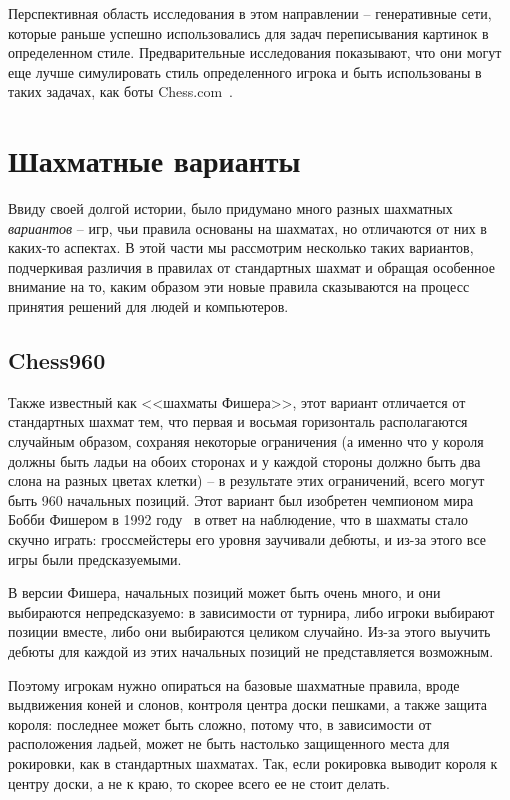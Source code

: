 \documentclass{article}
\begin{document}
Перспективная область исследования в этом направлении -- генеративные сети,
которые раньше успешно использовались для задач переписывания картинок в определенном стиле.
Предварительные исследования показывают, что они могут еще лучше симулировать стиль определенного игрока
и быть использованы в таких задачах, как боты Chess.com~\cite{chess-stylegan}.

\section{Шахматные варианты}

Ввиду своей долгой истории, было придумано много разных шахматных \emph{вариантов} --
игр, чьи правила основаны на шахматах, но отличаются от них в каких-то аспектах.
В этой части мы рассмотрим несколько таких вариантов, 
подчеркивая различия в правилах от стандартных шахмат
и обращая особенное внимание на то,
каким образом эти новые правила
сказываются на процесс принятия решений для людей и компьютеров.

\subsection{Chess960}

Также известный как <<шахматы Фишера>>, этот вариант
отличается от стандартных шахмат тем, что первая и восьмая горизонталь располагаются случайным образом,
сохраняя некоторые ограничения (а именно что у короля должны быть ладьи на обоих сторонах и у каждой стороны должно быть два слона на разных цветах клетки) --
в результате этих ограничений, всего могут быть 960 начальных позиций.
Этот вариант был изобретен чемпионом мира Бобби Фишером в 1992 году~\cite{chess960}
в ответ на наблюдение, что в шахматы стало скучно играть:
гроссмейстеры его уровня заучивали дебюты,
и из-за этого все игры были предсказуемыми.

В версии Фишера, 
начальных позиций может быть очень много,
и они выбираются непредсказуемо:
в зависимости от турнира,
либо игроки выбирают позиции вместе,
либо они выбираются целиком случайно.
Из-за этого выучить дебюты для каждой из этих начальных позиций
не представляется возможным.

Поэтому игрокам нужно опираться на базовые шахматные правила,
вроде выдвижения коней и слонов, контроля центра доски пешками,
а также защита короля:
последнее может быть сложно, потому что, в зависимости от расположения ладьей,
может не быть настолько защищенного места для рокировки, как в стандартных шахматах.
Так, если рокировка выводит короля к центру доски, а не к краю, то скорее всего ее не стоит делать.
\end{document}
